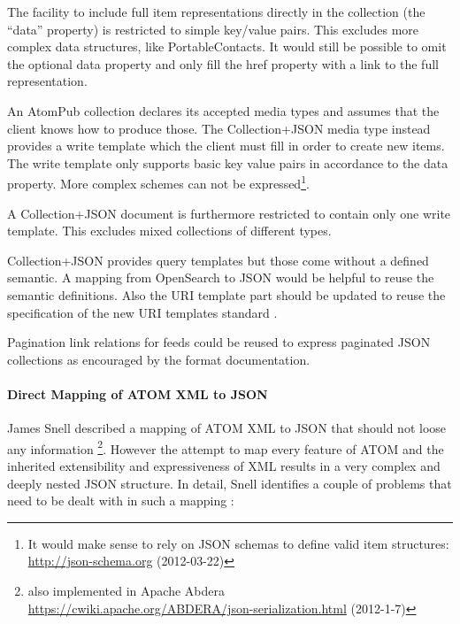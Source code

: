 \documentclass[11pt,a4paper,headsepline,twoside]{scrartcl}		%
\newcommand{\citeurl}[2]{\url{#1} (#2)}
\begin{document}
The facility to include full item representations directly in the collection
(the ``data'' property) is restricted to simple key/value pairs. This excludes
more complex data structures, like PortableContacts. It would still be possible
to omit the optional data property and only fill the href property with a link
to the full representation.

An AtomPub collection declares its accepted media types and assumes that the
client knows how to produce those. The Collection+JSON media type instead
provides a write template which the client must fill in order to create new
items. The write template only supports basic key value pairs in accordance to
the data property. More complex schemes can not be expressed\footnote{It would
  make sense to rely on JSON schemas to define valid item structures:
  \citeurl{http://json-schema.org}{2012-03-22}}.

A Collection+JSON document is furthermore restricted to contain only one write
template. This excludes mixed collections of different types.

Collection+JSON provides query templates but those come without a defined
semantic. A mapping from OpenSearch to JSON would be helpful to reuse the
semantic definitions. Also the URI template part should be updated to reuse the
specification of the new URI templates standard \cite{RFC6570}.

Pagination link relations for feeds \cite{RFC5005} could be reused to express
paginated JSON collections as encouraged by the format
documentation\cite[sec. 5.5]{Amundsen2011a}.


\paragraph{Direct Mapping of ATOM XML to JSON}

James Snell described a mapping of ATOM XML to JSON that should not loose any
information \cite{Snell2008}\footnote{also implemented in Apache Abdera
  \citeurl{https://cwiki.apache.org/ABDERA/json-serialization.html}{2012-1-7}}. However
the attempt to map every feature of ATOM and the inherited extensibility and
expressiveness of XML results in a very complex and deeply nested JSON
structure. In detail, Snell identifies a couple of problems that need to be
dealt with in such a mapping \cite{Snell2008}:
\end{document}
